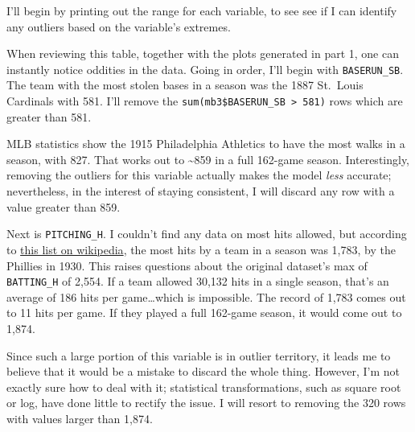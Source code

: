 \documentclass[]{article}
\begin{document}
I'll begin by printing out the range for each variable, to see see if I
can identify any outliers based on the variable's extremes.

\begin{table}[H]
\centering{}

\end{table}

When reviewing this table, together with the plots generated in part 1,
one can instantly notice oddities in the data. Going in order, I'll
begin with \texttt{BASERUN\_SB}. The team with the most stolen bases in
a season was the 1887 St.~Louis Cardinals with 581. I'll remove the
\texttt{sum(mb3\$BASERUN\_SB\ \textgreater{}\ 581)} rows which are
greater than 581.

MLB statistics show the 1915 Philadelphia Athletics to have the most
walks in a season, with 827. That works out to \textasciitilde{}859 in a
full 162-game season. Interestingly, removing the outliers for this
variable actually makes the model \emph{less} accurate; nevertheless, in
the interest of staying consistent, I will discard any row with a value
greater than 859.

Next is \texttt{PITCHING\_H}. I couldn't find any data on most hits
allowed, but according to
\href{https://en.wikipedia.org/wiki/List_of_Major_League_Baseball_hit_records}{this
list on wikipedia}, the most hits by a team in a season was 1,783, by
the Phillies in 1930. This raises questions about the original dataset's
max of \texttt{BATTING\_H} of 2,554. If a team allowed 30,132 hits in a
single season, that's an average of 186 hits per game\ldots{}which is
impossible. The record of 1,783 comes out to 11 hits per game. If they
played a full 162-game season, it would come out to 1,874.

Since such a large portion of this variable is in outlier territory, it
leads me to believe that it would be a mistake to discard the whole
thing. However, I'm not exactly sure how to deal with it; statistical
transformations, such as square root or log, have done little to rectify
the issue. I will resort to removing the 320 rows with values larger
than 1,874.
\end{document}
